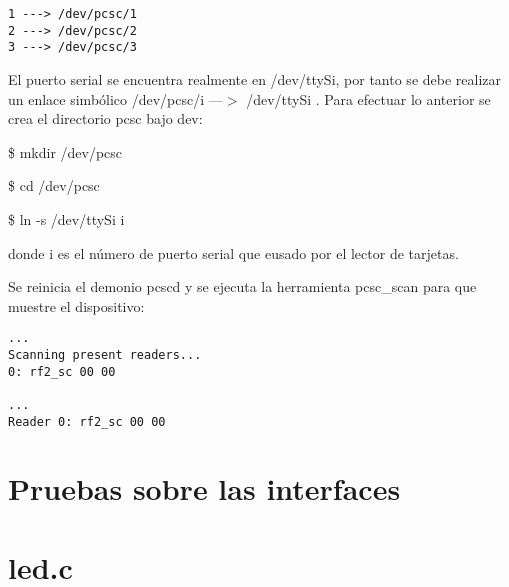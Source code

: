 \begin{verbatim}
1 ---> /dev/pcsc/1 
2 ---> /dev/pcsc/2 
3 ---> /dev/pcsc/3 
\end{verbatim}

El puerto serial se encuentra realmente en /dev/ttySi, por tanto se debe realizar un enlace simbólico /dev/pcsc/i ---$>$ /dev/ttySi . Para efectuar lo anterior se crea el directorio pcsc bajo dev: 

\bigskip
\centerline{\$ mkdir /dev/pcsc}

\centerline{\$ cd /dev/pcsc}

\centerline{\$ ln -s /dev/ttySi i}

donde i es el número de puerto serial que eusado por el lector de tarjetas. 

\bigskip
Se reinicia el demonio pcscd y se ejecuta la herramienta pcsc\_scan para que muestre el dispositivo: 

\begin{verbatim}
...	
Scanning present readers... 
0: rf2_sc 00 00 

... 
Reader 0: rf2_sc 00 00 
\end{verbatim}


\section{Pruebas sobre las interfaces}

\section{led.c}\label{anx_sw_led}

